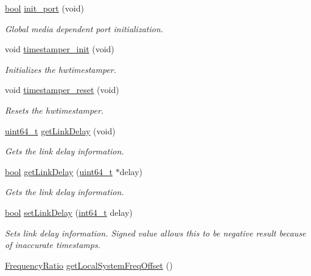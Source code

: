 \begin{DoxyCompactItemize}
\hyperlink{avb__gptp_8h_af6a258d8f3ee5206d682d799316314b1}{bool} \hyperlink{class_common_port_ae2f86408116b0a551da01c6f92f03ff9}{init\+\_\+port} (void)
\begin{DoxyCompactList}\small\item\em Global media dependent port initialization. \end{DoxyCompactList}\item 
void \hyperlink{class_common_port_a64530a2fb5ad64bdc7e61b2e37791191}{timestamper\+\_\+init} (void)
\begin{DoxyCompactList}\small\item\em Initializes the hwtimestamper. \end{DoxyCompactList}\item 
void \hyperlink{class_common_port_a8c575c35e2d432d8e401e48fa0cea8f8}{timestamper\+\_\+reset} (void)
\begin{DoxyCompactList}\small\item\em Resets the hwtimestamper. \end{DoxyCompactList}\item 
\hyperlink{parse_8c_aec6fcb673ff035718c238c8c9d544c47}{uint64\+\_\+t} \hyperlink{class_common_port_a62887d159222a2b222fb9cf7c97a3218}{get\+Link\+Delay} (void)
\begin{DoxyCompactList}\small\item\em Gets the link delay information. \end{DoxyCompactList}\item 
\hyperlink{avb__gptp_8h_af6a258d8f3ee5206d682d799316314b1}{bool} \hyperlink{class_common_port_a77e6b8d3c4cb0ed6775c1075e0dc0e93}{get\+Link\+Delay} (\hyperlink{parse_8c_aec6fcb673ff035718c238c8c9d544c47}{uint64\+\_\+t} $\ast$delay)
\begin{DoxyCompactList}\small\item\em Gets the link delay information. \end{DoxyCompactList}\item 
\hyperlink{avb__gptp_8h_af6a258d8f3ee5206d682d799316314b1}{bool} \hyperlink{class_common_port_aa6f951e3dbcfd28bf9c601746f9ac809}{set\+Link\+Delay} (\hyperlink{parse_8c_a67a9885ef4908cb72ce26d75b694386c}{int64\+\_\+t} delay)
\begin{DoxyCompactList}\small\item\em Sets link delay information. Signed value allows this to be negative result because of inaccurate timestamps. \end{DoxyCompactList}\item 
\hyperlink{ptptypes_8hpp_a84de47dc2ed889ecd2b61706d3ad0f2e}{Frequency\+Ratio} \hyperlink{class_common_port_a921c47366f1d2bc72191d6b5043c2678}{get\+Local\+System\+Freq\+Offset} ()

\end{DoxyCompactItemize}

